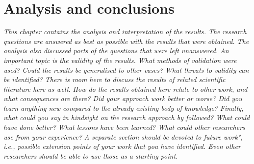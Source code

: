 \chapter{Analysis and conclusions}
\emph{This chapter contains the analysis and interpretation of the results.
The research questions are answered as best as possible with the results that were obtained.
The analysis also discussed parts of the questions that were left unanswered.
An important topic is the validity of the results. What methods of validation were used? Could
the results be generalised to other cases? What threats to validity can be identified? There is
room here to discuss the results of related scientific literature here as well. How do the results
obtained here relate to other work, and what consequences are there? Did your approach
work better or worse? Did you learn anything new compared to the already existing body of
knowledge? Finally, what could you say in hindsight on the research approach by followed?
What could have done better? What lessons have been learned? What could other researchers
use from your experience? A separate section should be devoted to future work", i.e., possible
extension points of your work that you have identified. Even other researchers should be able
to use those as a starting point.}
